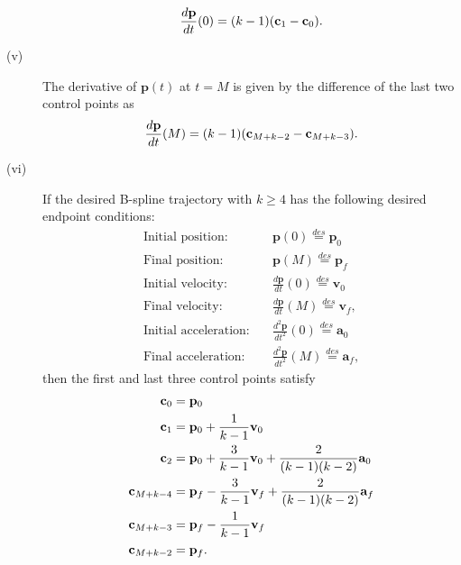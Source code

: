 \begin{corollary}
\begin{description}
		\[
			\frac{d\mathbf{p}}{dt}(0) = (k-1)(\mathbf{c}_1 - \mathbf{c}_0).
		\]
	\item[(v)] The derivative of $\mathbf{p}(t)$ at $t=M$ is given by the difference of the last two control points as
		\[
			\frac{d\mathbf{p}}{dt}(M) = (k-1)(\mathbf{c}_{M+k-2} - \mathbf{c}_{M+k-3}).
		\]
	\item[(vi)] If the desired B-spline trajectory with $k\geq 4$ has the following desired endpoint conditions:
		\begin{align*}
			\text{Initial position:} &\quad \mathbf{p}(0) \stackrel{des}{=} \mathbf{p}_0 \\	
			\text{Final position:} &\quad \mathbf{p}(M) \stackrel{des}{=} \mathbf{p}_f \\
			\text{Initial velocity:} &\quad \frac{d\mathbf{p}}{dt}(0) \stackrel{des}{=} \mathbf{v}_0 \\	
			\text{Final velocity:} &\quad \frac{d\mathbf{p}}{dt}(M) \stackrel{des}{=} \mathbf{v}_f, \\
			\text{Initial acceleration:} &\quad \frac{d^2\mathbf{p}}{dt^2}(0) \stackrel{des}{=} \mathbf{a}_0 \\	
			\text{Final acceleration:} &\quad \frac{d^2\mathbf{p}}{dt^2}(M) \stackrel{des}{=} \mathbf{a}_f,
		\end{align*}
		then the first and last three control points satisfy
		\begin{align*}
			\mathbf{c}_0 &= \mathbf{p}_0 \\
			\mathbf{c}_1 &= \mathbf{p}_0 + \frac{1}{k-1} \mathbf{v}_0 \\
			\mathbf{c}_2 &= \mathbf{p}_0 + \frac{3}{k-1} \mathbf{v}_0 + \frac{2}{(k-1)(k-2)}\mathbf{a}_0 \\
			\mathbf{c}_{M+k-4} &= \mathbf{p}_f - \frac{3}{k-1}\mathbf{v}_f + \frac{2}{(k-1)(k-2)}\mathbf{a}_f \\
			\mathbf{c}_{M+k-3} &= \mathbf{p}_f - \frac{1}{k-1}\mathbf{v}_f \\
			\mathbf{c}_{M+k-2} &= \mathbf{p}_f.
		\end{align*}
	\end{description}
\end{corollary}




